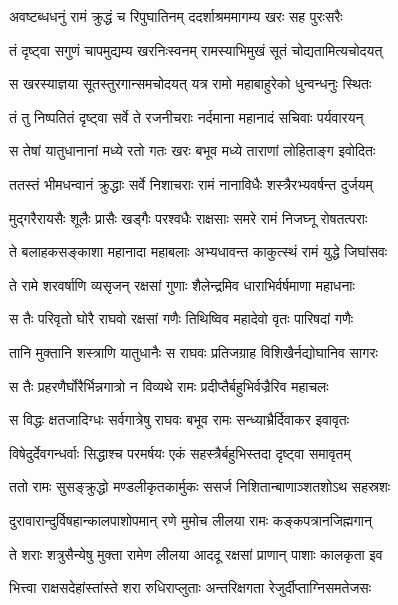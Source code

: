 \twolineshloka
{अवष्टब्धधनुं रामं क्रुद्धं च रिपुघातिनम्}
{ददर्शाश्रममागम्य खरः सह पुरःसरैः} %

\twolineshloka
{तं दृष्ट्वा सगुणं चापमुद्यम्य खरनिःस्वनम्}
{रामस्याभिमुखं सूतं चोद्यतामित्यचोदयत्} %

\twolineshloka
{स खरस्याज्ञया सूतस्तुरगान्समचोदयत्}
{यत्र रामो महाबाहुरेको धुन्वन्धनुः स्थितः} %

\twolineshloka
{तं तु निष्पतितं दृष्ट्वा सर्वे ते रजनीचराः}
{नर्दमाना महानादं सचिवाः पर्यवारयन्} %

\twolineshloka
{स तेषां यातुधानानां मध्ये रतो गतः खरः}
{बभूव मध्ये ताराणां लोहिताङ्ग इवोदितः} %

\twolineshloka
{ततस्तं भीमधन्वानं क्रुद्धाः सर्वे निशाचराः}
{रामं नानाविधैः शस्त्रैरभ्यवर्षन्त दुर्जयम्} %

\twolineshloka
{मुद्गरैरायसैः शूलैः प्रासैः खड्गैः परश्वधैः}
{राक्षसाः समरे रामं निजघ्नू रोषतत्पराः} %

\twolineshloka
{ते बलाहकसङ्काशा महानादा महाबलाः}
{अभ्यधावन्त काकुत्स्थं रामं युद्धे जिघांसवः} %

\twolineshloka
{ते रामे शरवर्षाणि व्यसृजन् रक्षसां गुणाः}
{शैलेन्द्रमिव धाराभिर्वर्षमाणा महाधनाः} %

\twolineshloka
{स तैः परिवृतो घोरै राघवो रक्षसां गणैः}
{तिथिष्विव महादेवो वृतः पारिषदां गणैः} %

\twolineshloka
{तानि मुक्तानि शस्त्राणि यातुधानैः स राघवः}
{प्रतिजग्राह विशिखैर्नद्योघानिव सागरः} %

\twolineshloka
{स तैः प्रहरणैर्घोरैर्भिन्नगात्रो न विव्यथे}
{रामः प्रदीप्तैर्बहुभिर्वज्रैरिव महाचलः} %

\twolineshloka
{स विद्धः क्षतजादिग्धः सर्वगात्रेषु राघवः}
{बभूव रामः सन्ध्याभ्रैर्दिवाकर इवावृतः} %

\twolineshloka
{विषेदुर्देवगन्धर्वाः सिद्धाश्च परमर्षयः}
{एकं सहस्त्रैर्बहुभिस्तदा दृष्ट्वा समावृतम्} %

\twolineshloka
{ततो रामः सुसङ्क्रुद्धो मण्डलीकृतकार्मुकः}
{ससर्ज निशितान्बाणाञ्शतशोऽथ सहस्रशः} %

\twolineshloka
{दुरावारान्दुर्विषहान्कालपाशोपमान् रणे}
{मुमोच लीलया रामः कङ्कपत्रानजिह्मगान्} %

\twolineshloka
{ते शराः शत्रुसैन्येषु मुक्ता रामेण लीलया}
{आददू रक्षसां प्राणान् पाशाः कालकृता इव} %

\twolineshloka
{भित्त्वा राक्षसदेहांस्तांस्ते शरा रुधिराप्लुताः}
{अन्तरिक्षगता रेजुर्दीप्ताग्निसमतेजसः} %

